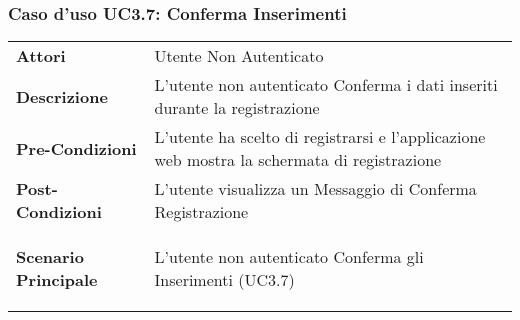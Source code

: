 \subsubsection{Caso d'uso UC3.7:  Conferma Inserimenti}
\label{UC3_7}

\begin{longtable}{ l | p{11cm}}
	\hline
	\rowcolor{Gray}
	 \multicolumn{2}{c}{UC3.7 - Conferma Inserimenti} \\
	 \hline
	\textbf{Attori} & Utente Non Autenticato \\
	\textbf{Descrizione} & L'utente non autenticato Conferma i dati inseriti durante la registrazione \\
	\textbf{Pre-Condizioni} & L'utente ha scelto di registrarsi e l'applicazione web mostra la schermata di registrazione \\
	\textbf{Post-Condizioni} & L'utente visualizza un Messaggio di Conferma Registrazione \\
	\textbf{Scenario Principale} & \begin{enumerate*}[label=(\arabic*.),itemjoin={\newline}]
		\item L'utente non autenticato Conferma gli Inserimenti (UC3.7)
	\end{enumerate*}\\
\end{longtable}